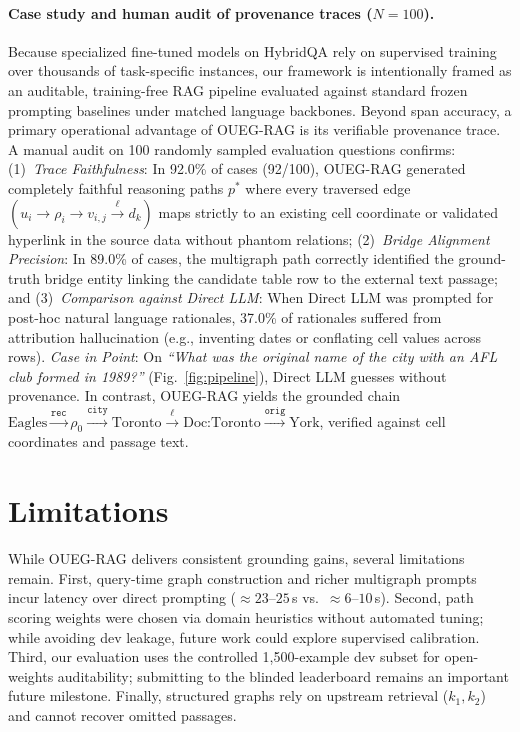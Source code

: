 \documentclass[runningheads]{llncs}
\begin{document}
\paragraph{Case study and human audit of provenance traces ($N=100$).}
Because specialized fine-tuned models on HybridQA rely on supervised training over thousands of task-specific instances, our framework is intentionally framed as an auditable, training-free RAG pipeline evaluated against standard frozen prompting baselines under matched language backbones. Beyond span accuracy, a primary operational advantage of OUEG-RAG is its verifiable provenance trace. A manual audit on 100 randomly sampled evaluation questions confirms:
(1)~\emph{Trace Faithfulness}: In 92.0\% of cases (92/100), OUEG-RAG generated completely faithful reasoning paths $p^*$ where every traversed edge $(u_i \rightarrow \rho_i \rightarrow v_{i,j} \xrightarrow{\ell} d_k)$ maps strictly to an existing cell coordinate or validated hyperlink in the source data without phantom relations;
(2)~\emph{Bridge Alignment Precision}: In 89.0\% of cases, the multigraph path correctly identified the ground-truth bridge entity linking the candidate table row to the external text passage; and
(3)~\emph{Comparison against Direct LLM}: When Direct LLM was prompted for post-hoc natural language rationales, 37.0\% of rationales suffered from attribution hallucination (e.g., inventing dates or conflating cell values across rows).
\emph{Case in Point}: On \textit{``What was the original name of the city with an AFL club formed in 1989?''} (Fig.~\ref{fig:pipeline}), Direct LLM guesses without provenance. In contrast, OUEG-RAG yields the grounded chain $\text{Eagles} \xrightarrow{\texttt{rec}} \rho_0 \xrightarrow{\texttt{city}} \text{Toronto} \xrightarrow{\ell} \text{Doc:Toronto} \xrightarrow{\texttt{orig}} \text{York}$, verified against cell coordinates and passage text.

\section{Limitations}
While OUEG-RAG delivers consistent grounding gains, several limitations remain. First, query-time graph construction and richer multigraph prompts incur latency over direct prompting ($\approx 23\text{--}25$\,s vs.\ $\approx 6\text{--}10$\,s). Second, path scoring weights were chosen via domain heuristics without automated tuning; while avoiding dev leakage, future work could explore supervised calibration. Third, our evaluation uses the controlled 1,500-example dev subset for open-weights auditability; submitting to the blinded leaderboard remains an important future milestone. Finally, structured graphs rely on upstream retrieval ($k_1, k_2$) and cannot recover omitted passages.
\end{document}
